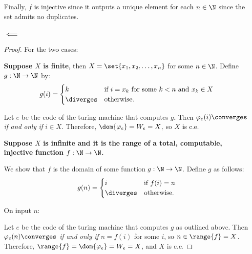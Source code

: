 \begin{problem}[2]
\begin{answer}
      Finally, $f$ is injective since it outputs a unique element
      for each $n \in \N$ since the set admits no duplicates.

    \subsubsection*{$\impliedby$}
    
    \begin{proof}
      For the two cases:

      \step
      \item \textbf{Suppose $X$ is finite}, then $X = \set{x_1, x_2, \ldots, x_n}$
      for some $n \in \N$.
      Define $g: \N \to \N$ by:
      \[ g(i) = \begin{cases}
        k & \text{if $i = x_k$ for some $k < n$ and $x_k \in X$} \\
        \diverges & \text{otherwise.}
      \end{cases} \]

      Let $e$ be the code of the turing machine that computes $g$.
      Then $\varphi_e(i) \converges$ \emph{if and only if}
      $i \in X$. Therefore, $\dom{\varphi_e} = W_e = X$,
      so $X$ is c.e.

      \step
      \textbf{Suppose $X$ is infinite and it is the range of a
      total, computable, injective function $f: \N \to \N$.}

      We show that $f$ is the domain of some function $g : \N \to \N$.
      Define $g$ as follows:
      \[ g(n) = \begin{cases}
        i & \text{if $f(i) = n$} \\
        \diverges & \text{otherwise.}
      \end{cases} \]

      \step
      \begin{algorithm}[H]
        \caption{$g : \N \to \N$}
        On input $n$: \\
      \end{algorithm}

      \step
      Let $e$ be the code of the turing machine that computes $g$
      as outlined above.
      Then $\varphi_e(n) \converges$ \emph{if and only if}
      $n = f(i)$ for some $i$, so $n \in \range{f} = X$.
      Therefore, $\range{f} = \dom{\varphi_e} = W_e = X$,
      and $X$ is c.e.
    \end{proof}
  \end{answer}
\end{problem}
